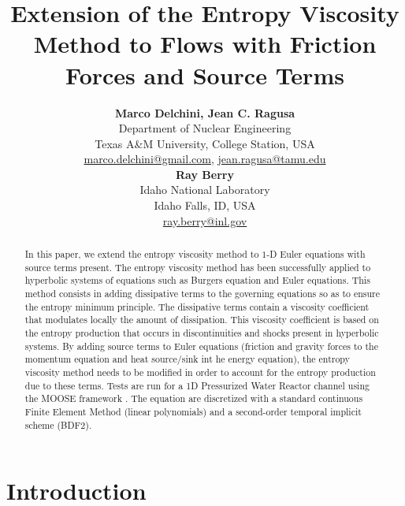 \documentclass[12pt]{article}
\title{Extension of the Entropy Viscosity Method to Flows with Friction Forces and Source Terms}
\author{ 
  \textbf{Marco Delchini, Jean C. Ragusa} \\
  Department of Nuclear Engineering \\
  Texas A\&M University, College Station, USA\\
  \href{mailto:marco.delchini@gmail.com}{marco.delchini@gmail.com}, 
  \href{mailto:jean.ragusa@tamu.edu}{jean.ragusa@tamu.edu}\\
  \textbf{Ray Berry} \\
  Idaho National Laboratory\\
  Idaho Falls, ID, USA\\
  \href{mailto:ray.berry@inl.gov}{ray.berry@inl.gov}
}
\begin{document}


\maketitle

\begin{abstract}
In this paper, we extend the entropy viscosity method \cite{valentin, jlg1, jlg2} to $1$-D Euler equations with source terms present. 
The entropy viscosity method has been successfully applied to hyperbolic systems of equations such as Burgers equation and Euler
equations. This method consists in adding dissipative terms to the governing equations so as to ensure the entropy minimum principle. The dissipative terms contain a viscosity coefficient that modulates locally the amount of dissipation.
This viscosity coefficient is based on the entropy production that occurs in discontinuities and shocks present in hyperbolic systems.
By adding source terms to Euler equations (friction and gravity forces to the momentum equation and heat source/sink int he energy equation), the entropy viscosity method needs to be modified in order to account for the entropy production due to these terms. Tests are run for a 1D Pressurized Water Reactor channel using the MOOSE framework \cite{Moose}. The equation are discretized with a standard continuous Finite Element Method (linear polynomials) and a second-order temporal implicit scheme (BDF2). 
\end{abstract}


%
\section{Introduction}
\label{sect::intro}
\end{document}
